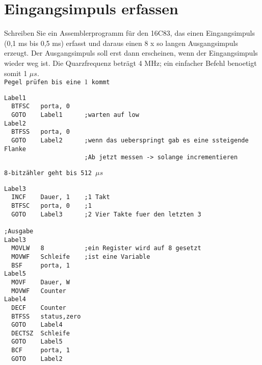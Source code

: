 \section*{Eingangsimpuls erfassen }
Schreiben Sie ein Assemblerprogramm für den 16C83, das einen Eingangsimpuls (0,1 ms bis 0,5
ms) erfasst und daraus einen 8 x so langen Ausgangsimpuls erzeugt. Der Ausgangsimpuls soll erst
dann erscheinen, wenn der Eingangsimpuls wieder weg ist. Die Quarzfrequenz beträgt 4 MHz; ein
einfacher Befehl benoetigt somit 1 $\mu s$.\\
\texttt{Pegel prüfen bis eine $1$ kommt}
\begin{lstlisting}[language=avr]
Label1
  BTFSC   porta, 0
  GOTO    Label1      ;warten auf low
Label2
  BTFSS   porta, 0
  GOTO    Label2      ;wenn das ueberspringt gab es eine ssteigende Flanke
                      ;Ab jetzt messen -> solange incrementieren
\end{lstlisting}
\texttt{8-bitzähler geht bis 512 $\mu s$}
\begin{lstlisting}[language=avr]
Label3
  INCF    Dauer, 1    ;1 Takt
  BTFSC   porta, 0    ;1
  GOTO    Label3      ;2 Vier Takte fuer den letzten 3
   
;Ausgabe
Label3
  MOVLW   8           ;ein Register wird auf 8 gesetzt
  MOVWF   Schleife    ;ist eine Variable
  BSF     porta, 1   
Label5
  MOVF    Dauer, W
  MOVWF   Counter
Label4
  DECF    Counter
  BTFSS   status,zero
  GOTO    Label4
  DECTSZ  Schleife
  GOTO    Label5
  BCF     porta, 1
  GOTO    Label2
\end{lstlisting}